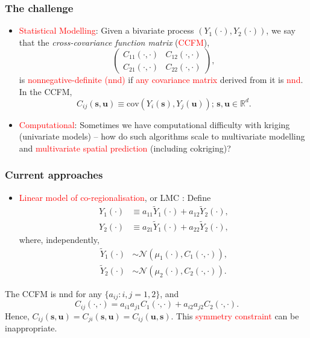 \documentclass{beamer}
\newcommand{\Yt}{\widetilde{Y}}
\newcommand{\s}{\mathbf{s}}
\renewcommand{\u}{\mathbf{u}}
\newcommand{\cov}{\mathrm{cov}}
\begin{document}

\begin{frame}
\frametitle{The challenge}

\begin{itemize}
\item \textcolor{red}{Statistical Modelling}: Given a bivariate process $(Y_1(\cdot), Y_2(\cdot))$, we say that the \emph{cross-covariance function matrix} (\textcolor{red}{CCFM}),
\begin{equation*}
\label{eq1}
\left(\begin{array}{cc} C_{11}(\cdot,\cdot) & C_{12}(\cdot,\cdot) \\ C_{21}(\cdot,\cdot) & C_{22}(\cdot,\cdot)\end{array} \right),
\end{equation*}
is \textcolor{red}{nonnegative-definite (nnd)} if \textcolor{red}{any covariance matrix} derived from it is \textcolor{red}{nnd}. In the CCFM,
$$
C_{ij}(\s,\u)\equiv\cov(Y_i(\s),Y_j(\u));\,\s,\u\in\mathbb{R}^d.
$$
\item \textcolor{red}{Computational}: Sometimes we have computational difficulty with kriging (univariate models) -- how do such algorithms scale to multivariate modelling and \textcolor{red}{multivariate spatial prediction} (including cokriging)? %
\end{itemize}
\end{frame}



\begin{frame}
\frametitle{Current approaches}

\begin{itemize}
\item \textcolor{red}{Linear model of co-regionalisation}, or LMC \citep{JournelHuijbregts1978, Wackernagel1995}: Define
\begin{align*}
    Y_1(\cdot) &\equiv a_{11}\Yt_1(\cdot) + a_{12}\Yt_2(\cdot),\\
    Y_2(\cdot) &\equiv a_{21}\Yt_1(\cdot) + a_{22}\Yt_2(\cdot),
\end{align*}
where, independently,
\begin{align*}
    \Yt_1(\cdot) &\sim \mathcal{N}(\mu_1(\cdot), C_{1}(\cdot,\cdot)),\\
    \Yt_2(\cdot) &\sim \mathcal{N}(\mu_2(\cdot), C_{2}(\cdot,\cdot)).
\end{align*}
\end{itemize}
The CCFM is nnd for any $\{a_{ij}: i,j = 1,2\}$, and 
$$
C_{ij}(\cdot,\cdot) = a_{i1}a_{j1}C_{1}(\cdot,\cdot) + a_{i2}a_{j2}C_{2}(\cdot,\cdot).
$$ 
Hence, $C_{ij}(\s,\u)=C_{ji}(\s,\u)=C_{ij}(\u,\s)$. This \textcolor{red}{symmetry constraint} can be inappropriate.

\end{frame}
\end{document}
